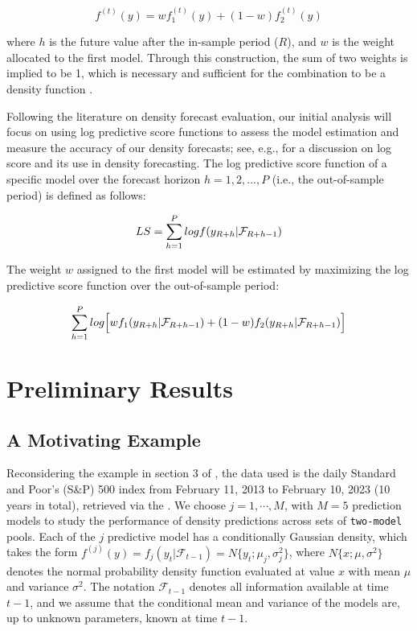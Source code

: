 \documentclass{monashthesis}
\begin{document}
\begin{equation}
f^{(t)}(y) = wf^{(t)}_1(y) + (1-w)f^{(t)}_2(y)
\end{equation}

where \(h\) is the future value after the in-sample period (\(R\)), and \(w\) is the weight allocated to the first model. Through this construction, the sum of two weights is implied to be 1, which is necessary and sufficient for the combination to be a density function \autocite{GA11}.

Following the literature on density forecast evaluation, our initial analysis will focus on using log predictive score functions to assess the model estimation and measure the accuracy of our density forecasts; see, e.g., \textcite{GA11} for a discussion on log score and its use in density forecasting. The log predictive score function of a specific model over the forecast horizon \(h=1,2,...,P\) (i.e., the out-of-sample period) is defined as follows:

\begin{equation}
LS = \sum^P_{h=1} logf(y_{\small{R+h}}| \mathcal{F}_{\small{R+h-1}})
\end{equation}

The weight \(w\) assigned to the first model will be estimated by maximizing the log predictive score function over the out-of-sample period:

\begin{equation}
\sum^P_{h=1}log\Big[wf_1(y_{\small{R+h}}|\mathcal{F}_{\small{R+h-1}}) + (1-w)f_2(y_{\small{R+h}}|\mathcal{F}_{\small{R+h-1}})\Big]
\end{equation}

\hypertarget{preliminary-results}{%
\chapter{Preliminary Results}\label{preliminary-results}}

\hypertarget{a-motivating-example}{%
\section{A Motivating Example}\label{a-motivating-example}}

Reconsidering the example in section 3 of \textcite{GA11}, the data used is the daily Standard and Poor's (S\&P) 500 index from February 11, 2013 to February 10, 2023 (10 years in total), retrieved via the \textcite{SP500}. We choose \(j=1,\cdots,M\), with \(M=5\) prediction models to study the performance of density predictions across sets of \texttt{two-model} pools. Each of the \(j\) predictive model has a conditionally Gaussian density, which takes the form \(f^{(j)}(y)=f_j(y_t|\mathcal{F}_{t-1})=N\{y_t; \mu_j, \sigma^2_j\}\), where \(N\{x; \mu, \sigma^2\}\) denotes the normal probability density function evaluated at value \(x\) with mean \(\mu\) and variance \(\sigma^2\). The notation \(\mathcal{F}_{t-1}\) denotes all information available at time \(t-1\), and we assume that the conditional mean and variance of the models are, up to unknown parameters, known at time \(t-1\).
\end{document}
